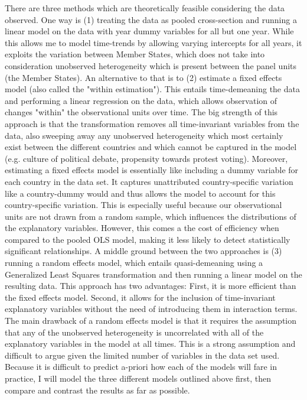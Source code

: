There are three methods which are theoretically feasible considering the data observed. One way is (1) treating the data as pooled cross-section and running a linear model on the data with year dummy variables for all but one year. While this allows me to model time-trends by allowing varying intercepts for all years, it exploits the variation between Member States, which does not take into consideration unobserved heterogeneity which is present between the panel units (the Member States). An alternative to that is to (2) estimate a fixed effects model (also called the "within estimation"). This entails time-demeaning the data and performing a linear regression on the data, which allows observation of changes "within" the observational units over time.
The big strength of this approach is that the transformation removes all time-invariant variables from the data, also sweeping away any unobserved heterogeneity which most certainly exist between the different countries and which cannot be captured in the model (e.g. culture of political debate, propensity towards protest voting). Moreover, estimating a fixed effects model is essentially like including a dummy variable for each country in the data set. It captures unattributed country-specific variation like a country-dummy would and thus allows the model to account for this country-specific variation. This is especially useful because our observational units are not drawn from a random sample, which influences the distributions of the explanatory variables.  However, this comes a the cost of efficiency when compared to the pooled OLS model, making it less likely to detect statistically significant relationships. A middle ground between the two approaches is (3) running a random effects model, which entails quasi-demeaning using a Generalized Least Squares transformation and then running a linear model on the resulting data. This approach has two advantages: First, it is more efficient than the fixed effects model. Second, it allows for the inclusion of time-invariant explanatory variables without the need of introducing them in interaction terms. The main drawback of a random effects model is that it requires the assumption that any of the unobserved heterogeneity is uncorrelated with all of the explanatory variables in the model at all times. This is a strong assumption and difficult to argue given the limited number of variables in the data set used.
Because it is difficult to predict a-priori how each of the models will fare in practice, I will model the three different models outlined above first, then compare and contrast the results as far as possible.


